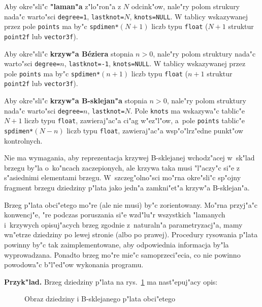 Aby okre"sli"c \textbf{"laman"a} z"lo"ron"a z $N$ odcink"ow,
nale"ry polom strukury nada"c warto"sci
\texttt{degree=1}, \texttt{lastknot=$N$}, \texttt{knots=NULL}. W tablicy
wskazywanej przez pole \texttt{points} ma by"c \texttt{spdimen*$(N+1)$}
liczb typu \texttt{float} ($N+1$ struktur \texttt{point2f} lub
\texttt{vector3f}).

Aby okre"sli"c \textbf{krzyw"a B\'{e}ziera} stopnia $n>0$, nale"ry polom
struktury nada"c warto"sci
\texttt{degree=$n$}, \texttt{lastknot=-1}, \texttt{knots=NULL}. W tablicy
wskazywanej przez pole \texttt{points} ma by"c \texttt{spdimen*$(n+1)$}
liczb typu \texttt{float} ($n+1$ struktur \texttt{point2f} lub
\texttt{vector3f}).

Aby okre"sli"c \textbf{krzyw"a B-sklejan"a} stopnia $n>0$, nale"ry polom
struktury nada"c warto"sci
\texttt{degree=$n$}, \texttt{lastknot=$N$}. Pole \texttt{knots} ma
wskazywa"c tablic"e $N+1$ liczb typu \texttt{float}, zawieraj"ac"a ci"ag
w"ez"l"ow, a~pole \texttt{points} tablic"e
\texttt{spdimen*$(N-n)$} liczb typu \texttt{float}, zawieraj"ac"a
wsp"o"lrz"edne punkt"ow kontrolnych.

Nie ma wymagania, aby reprezentacja krzywej B-sklejanej wchodz"acej
w~sk"lad brzegu by"la o~ko"ncach zaczepionych, ale krzywa taka musi
"l"aczy"c si"e z s"asiednimi elementami brzegu. W~szczeg"olno"sci mo"rna
okre"sli"c sp"ojny fragment brzegu dziedziny p"lata jako jedn"a
zamkni"et"a krzyw"a B-sklejan"a.

\vspace{\medskipamount}
Brzeg p"lata obci"etego mo"re (ale nie musi) by"c zorientowany. Mo"rna
przyj"a"c konwencj"e, "re podczas poruszania si"e wzd"lu"r wszystkich
"lamanych i~krzywych opisuj"acych brzeg zgodnie z~naturaln"a
parametryzacj"a, mamy wn"etrze dziedziny po lewej stronie (albo po prawej).
Procedury rysowania p"lata powinny by"c tak zaimplementowane, aby
odpowiednia informacja by"la wyprowadzana. Ponadto brzeg mo"re mie"c
samoprzeci"ecia, co nie powinno powodowa"c b"l"ed"ow wykonania programu.

\vspace{\medskipamount}\noindent
\textbf{Przyk"lad.} Brzeg dziedziny p"lata na
rys.~\ref{fig:trimpatch} ma nast"epuj"acy opis:%
\begin{figure}[ht]
  \centerline{}
  \caption{\label{fig:trimpatch}Obraz dziedziny i B-sklejanego p"lata
    obci"etego}
\end{figure}

